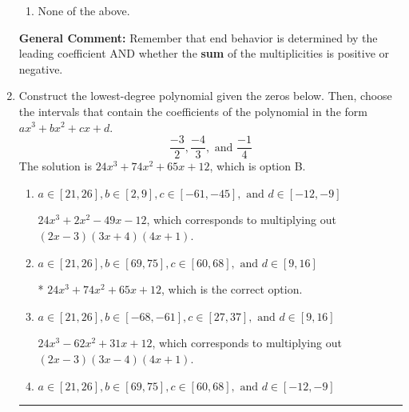 \documentclass{extbook}[14pt]
\newcommand{\litem}[1]{\item #1

\rule{\textwidth}{0.4pt}}
\begin{document}
\begin{enumerate}
{\begin{enumerate}[label=\Alph*.]
\item None of the above.\end{enumerate}
\textbf{General Comment:} Remember that end behavior is determined by the leading coefficient AND whether the \textbf{sum} of the multiplicities is positive or negative.
}
\litem{
Construct the lowest-degree polynomial given the zeros below. Then, choose the intervals that contain the coefficients of the polynomial in the form $ax^3+bx^2+cx+d$.
\[ \frac{-3}{2}, \frac{-4}{3}, \text{ and } \frac{-1}{4} \]The solution is \( 24x^{3} +74 x^{2} +65 x + 12 \), which is option B.\begin{enumerate}[label=\Alph*.]
\item \( a \in [21, 26], b \in [2, 9], c \in [-61, -45], \text{ and } d \in [-12, -9] \)

$24x^{3} +2 x^{2} -49 x -12$, which corresponds to multiplying out $(2x -3)(3x + 4)(4x + 1)$.
\item \( a \in [21, 26], b \in [69, 75], c \in [60, 68], \text{ and } d \in [9, 16] \)

* $24x^{3} +74 x^{2} +65 x + 12$, which is the correct option.
\item \( a \in [21, 26], b \in [-68, -61], c \in [27, 37], \text{ and } d \in [9, 16] \)

$24x^{3} -62 x^{2} +31 x + 12$, which corresponds to multiplying out $(2x -3)(3x -4)(4x + 1)$.
\item \( a \in [21, 26], b \in [69, 75], c \in [60, 68], \text{ and } d \in [-12, -9] \)


\end{enumerate}}
\end{enumerate}
\end{document}
